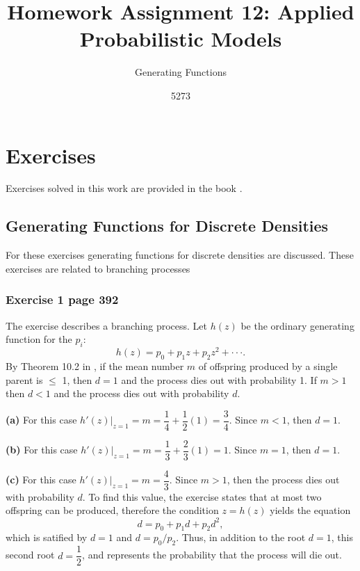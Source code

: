 \documentclass[10pt,leter,openany]{article}
\author{5273}
\title{Homework Assignment 12: Applied Probabilistic Models}
\subtitle{Generating Functions}
\date{}
\begin{document}
	
\maketitle

\section{Exercises}
	
	Exercises solved in this work are provided in the book \citet{grinstead2012introduction}. 
	
	\subsection{Generating Functions for Discrete Densities}
	
	For these exercises generating functions for discrete densities are discussed. These exercises are related to branching processes
	
	\subsubsection{Exercise 1 page 392}
	
			The exercise describes a branching process. Let $h(z)$ be the ordinary generating function for the $p_{i}$: 							\begin{equation}
					h(z) = p_{0} + p_{1}z + p_{2}z^{2} + \cdot \cdot \cdot .
			\end{equation} By Theorem 10.2 in \citet{grinstead2012introduction}, if the mean number $m$ of offspring produced by a single parent is $\leq$ 1, then $d = 1$ and the process dies out with probability 1. If $m > 1$ then $d < 1 $ and the process dies out with probability $d$.
	
			\textbf{(a)} For this case $h'(z)|_{z=1} = m = \dfrac{1}{4} + \dfrac{1}{2}\left( 1\right) = \dfrac{3}{4}$. Since $m < 1$, then $d = 1$.

			\textbf{(b)} For this case $h'(z)|_{z=1} = m = \dfrac{1}{3} + \dfrac{2}{3}\left( 1\right) = 1$. Since $m = 1$, then $d=1$.

	
			\textbf{(c)} For this case $h'(z)|_{z=1} = m = \dfrac{4}{3}$. Since $m>1$, then the process dies out with probability $d$. To find this value, the exercise states that at most two offspring can be produced, therefore the condition $z = h(z)$ yields the equation \begin{equation}
			d = p_{0} + p_{1}d + p_{2}d^{2},
			\end{equation} which is satified by $ d = 1 $ and $ d = p_{0}/ p_{2}$. Thus, in addition to the root $d=1$, this second 	root  $d = \dfrac{1}{2}$, and represents the probability that  the process will die out.
\end{document}
